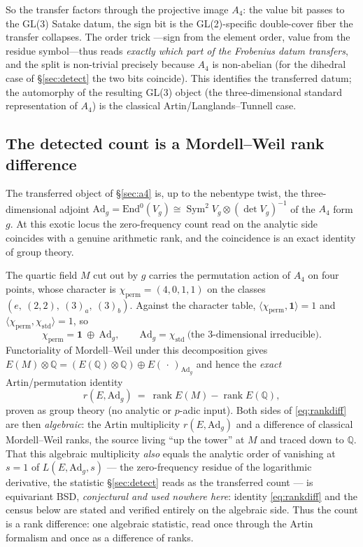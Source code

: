 \documentclass[11pt]{article}
\theoremstyle{definition}
\newcommand{\Sym}{\operatorname{Sym}}
\begin{document}
So the transfer factors through the projective image $A_4$: the value bit passes to the GL(3) Satake
datum, the sign bit is the GL(2)-specific double-cover fiber the transfer collapses. The order trick
---sign from the element order, value from the residue symbol---thus reads \emph{exactly which part
of the Frobenius datum transfers}, and the split is non-trivial precisely because $A_4$ is
non-abelian (for the dihedral case of \S\ref{sec:detect} the two bits coincide). This identifies the
transferred datum; the automorphy of the resulting GL(3) object (the three-dimensional standard
representation of $A_4$) is the classical Artin/Langlands--Tunnell case.

\subsection{The detected count is a Mordell--Weil rank difference}\label{sec:rankdiff}

The transferred object of \S\ref{sec:a4} is, up to the nebentype twist, the three-dimensional
adjoint $\mathrm{Ad}_g=\mathrm{End}^0(V_g)\cong\Sym^2 V_g\otimes(\det V_g)^{-1}$ of the $A_4$ form
$g$. At this exotic locus the zero-frequency count read on the analytic side coincides with a
genuine arithmetic rank, and the coincidence is an exact identity of group theory.

The quartic field $M$ cut out by $g$ carries the permutation action of $A_4$ on four points, whose
character is $\chi_{\mathrm{perm}}=(4,0,1,1)$ on the classes $(e,\ (2,2),\ (3)_a,\ (3)_b)$. Against the
character table, $\langle\chi_{\mathrm{perm}},\mathbf 1\rangle=1$ and
$\langle\chi_{\mathrm{perm}},\chi_{\mathrm{std}}\rangle=1$, so
\[
  \chi_{\mathrm{perm}}=\mathbf 1\ \oplus\ \mathrm{Ad}_g,\qquad \mathrm{Ad}_g=\chi_{\mathrm{std}}\
  \text{(the $3$-dimensional irreducible)} .
\]
Functoriality of Mordell--Weil under this decomposition gives
$E(M)\otimes\mathbb Q = (E(\mathbb Q)\otimes\mathbb Q)\oplus E(\,\cdot\,)_{\mathrm{Ad}_g}$ and hence the
\emph{exact} Artin/permutation identity
\begin{equation}\label{eq:rankdiff}
  r(E,\mathrm{Ad}_g)\ =\ \operatorname{rank}E(M)-\operatorname{rank}E(\mathbb Q),
\end{equation}
proven as group theory (no analytic or $p$-adic input). Both sides of \eqref{eq:rankdiff} are then
\emph{algebraic}: the Artin multiplicity $r(E,\mathrm{Ad}_g)$ and a difference of classical Mordell--Weil ranks,
the source living ``up the tower'' at $M$ and traced down to $\mathbb Q$. That this algebraic multiplicity
\emph{also} equals the analytic order of vanishing at $s=1$ of $L(E,\mathrm{Ad}_g,s)$ --- the zero-frequency
residue of the logarithmic derivative, the statistic \S\ref{sec:detect} reads as the transferred count --- is
equivariant BSD, \emph{conjectural and used nowhere here}: identity \eqref{eq:rankdiff} and the census below are
stated and verified entirely on the algebraic side. Thus the count is a rank difference: one algebraic statistic,
read once through the Artin formalism and once as a difference of ranks.
\end{document}
